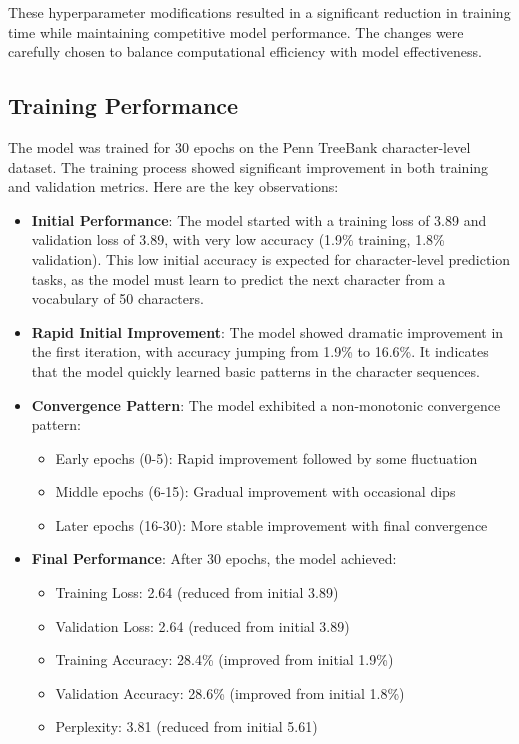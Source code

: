 \documentclass{article}
\begin{document}
These hyperparameter modifications resulted in a significant reduction in training time while maintaining competitive model performance. The changes were carefully chosen to balance computational efficiency with model effectiveness.

\subsection{Training Performance}
The model was trained for 30 epochs on the Penn TreeBank character-level dataset. The training process showed significant improvement in both training and validation metrics. Here are the key observations:

\begin{itemize}
    \item \textbf{Initial Performance}: The model started with a training loss of 3.89 and validation loss of 3.89, with very low accuracy (1.9\% training, 1.8\% validation). This low initial accuracy is expected for character-level prediction tasks, as the model must learn to predict the next character from a vocabulary of 50 characters.
    
    \item \textbf{Rapid Initial Improvement}: The model showed dramatic improvement in the first iteration, with accuracy jumping from 1.9\% to 16.6\%. It indicates that the model quickly learned basic patterns in the character sequences.
    
    \item \textbf{Convergence Pattern}: The model exhibited a non-monotonic convergence pattern:
    \begin{itemize}
        \item Early epochs (0-5): Rapid improvement followed by some fluctuation
        \item Middle epochs (6-15): Gradual improvement with occasional dips
        \item Later epochs (16-30): More stable improvement with final convergence
    \end{itemize}
    
    \item \textbf{Final Performance}: After 30 epochs, the model achieved:
    \begin{itemize}
        \item Training Loss: 2.64 (reduced from initial 3.89)
        \item Validation Loss: 2.64 (reduced from initial 3.89)
        \item Training Accuracy: 28.4\% (improved from initial 1.9\%)
        \item Validation Accuracy: 28.6\% (improved from initial 1.8\%)
        \item Perplexity: 3.81 (reduced from initial 5.61)
    \end{itemize}
    

\end{itemize}
\end{document}

